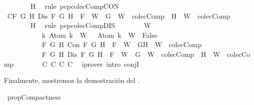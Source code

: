 \begin{isabellebody}
\ \ \ \ \ \ \isamarkupfalse%
\ H\ \isamarkupfalse%
\ {\isacharparenleft}rule\ pcp{\isacharunderscore}colecComp{\isacharunderscore}CON{\isacharparenright}\isanewline
\ \ \ \ \isamarkupfalse%
\ C{}{\isacharcolon}{\isachardoublequoteopen}{\isasymforall}F\ G\ H{\isachardot}\ Dis\ F\ G\ H\ {\isasymlongrightarrow}\ F\ {\isasymin}\ W\ {\isasymlongrightarrow}\ {\isacharbraceleft}G{\isacharbraceright}\ {\isasymunion}\ W\ {\isasymin}\ colecComp\ {\isasymor}\ {\isacharbraceleft}H{\isacharbraceright}\ {\isasymunion}\ W\ {\isasymin}\ colecComp{\isachardoublequoteclose}\isanewline
\ \ \ \ \ \ \isamarkupfalse%
\ H\ \isamarkupfalse%
\ {\isacharparenleft}rule\ pcp{\isacharunderscore}colecComp{\isacharunderscore}DIS{\isacharparenright}\isanewline
\ \ \ \ \isamarkupfalse%
\ {\isachardoublequoteopen}{\isasymbottom}\ {\isasymnotin}\ W\isanewline
\ \ \ \ \ \ \ \ \ \ {\isasymand}\ {\isacharparenleft}{\isasymforall}k{\isachardot}\ Atom\ k\ {\isasymin}\ W\ {\isasymlongrightarrow}\ \isactrlbold {\isasymnot}\ {\isacharparenleft}Atom\ k{\isacharparenright}\ {\isasymin}\ W\ {\isasymlongrightarrow}\ False{\isacharparenright}\isanewline
\ \ \ \ \ \ \ \ \ \ {\isasymand}\ {\isacharparenleft}{\isasymforall}F\ G\ H{\isachardot}\ Con\ F\ G\ H\ {\isasymlongrightarrow}\ F\ {\isasymin}\ W\ {\isasymlongrightarrow}\ {\isacharbraceleft}G{\isacharcomma}H{\isacharbraceright}\ {\isasymunion}\ W\ {\isasymin}\ colecComp{\isacharparenright}\isanewline
\ \ \ \ \ \ \ \ \ \ {\isasymand}\ {\isacharparenleft}{\isasymforall}F\ G\ H{\isachardot}\ Dis\ F\ G\ H\ {\isasymlongrightarrow}\ F\ {\isasymin}\ W\ {\isasymlongrightarrow}\ {\isacharbraceleft}G{\isacharbraceright}\ {\isasymunion}\ W\ {\isasymin}\ colecComp\ {\isasymor}\ {\isacharbraceleft}H{\isacharbraceright}\ {\isasymunion}\ W\ {\isasymin}\ colecComp{\isacharparenright}{\isachardoublequoteclose}\isanewline
\ \ \ \ \ \ \isamarkupfalse%
\ C{}\ C{}\ C{}\ C{}\ \isamarkupfalse%
\ {\isacharparenleft}iprover\ intro{\isacharcolon}\ conjI{\isacharparenright}\isanewline
\ \ \isamarkupfalse%
\isanewline
{}\isamarkupfalse%
%
\endisatagproof
{\isafoldproof}%
%
\isadelimproof
%
\endisadelimproof
%
\begin{isamarkuptext}%
Finalmente, mostremos la demostración del .%
\end{isamarkuptext}\isamarkuptrue%
\isamarkupfalse%
\ prop{\isacharunderscore}Compactness{\isacharcolon}\isanewline

\end{isabellebody}
